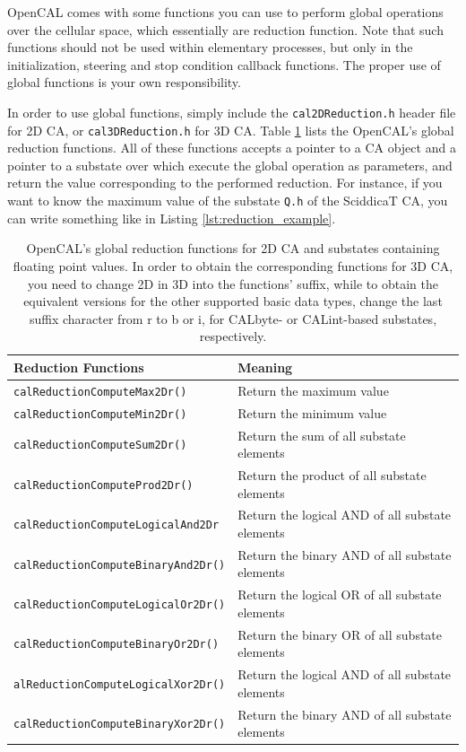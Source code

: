 OpenCAL comes with some functions you can use to perform global
operations over the cellular space, which essentially are reduction
function. Note that such functions should not be used within
elementary processes, but only in the initialization, steering and
stop condition callback functions. The proper use of global functions
is your own responsibility.

In order to use global functions, simply include the
\verb'cal2DReduction.h' header file for 2D CA, or
\verb'cal3DReduction.h' for 3D CA. Table \ref{tab:reductions} lists
the OpenCAL's global reduction functions. All of these functions
accepts a pointer to a CA object and a pointer to a substate over
which execute the global operation as parameters, and return the value
corresponding to the performed reduction. For instance, if you want to
know the maximum value of the substate \verb'Q.h' of the SciddicaT CA,
you can write something like in Listing \ref{lst:reduction_example}.



\begin{table}
  \centering
  \footnotesize
  \begin{tabular}{l|l}
    \hline
    Reduction Functions & Meaning \\
    \hline
    \verb'calReductionComputeMax2Dr()'       & Return the maximum value\\
    \verb'calReductionComputeMin2Dr()'       & Return the minimum value\\
    \verb'calReductionComputeSum2Dr()'       & Return the sum of all substate elements\\
    \verb'calReductionComputeProd2Dr()'      & Return the product of all substate elements\\
    \verb'calReductionComputeLogicalAnd2Dr'  & Return the logical AND of all substate elements\\
    \verb'calReductionComputeBinaryAnd2Dr()' & Return the binary AND of all substate elements\\
    \verb'calReductionComputeLogicalOr2Dr()' & Return the logical OR of all substate elements\\
    \verb'calReductionComputeBinaryOr2Dr()'  & Return the binary OR of all substate elements\\
    \verb'alReductionComputeLogicalXor2Dr()' & Return the logical AND of all substate elements\\
    \verb'calReductionComputeBinaryXor2Dr()' & Return the binary AND of all substate elements\\
    \hline
  \end{tabular}
  \caption{OpenCAL's global reduction functions for 2D CA and
    substates containing floating point values. In order to obtain the
    corresponding functions for 3D CA, you need to change 2D in 3D
    into the functions' suffix, while to obtain the equivalent
    versions for the other supported basic data types, change the last
    suffix character from r to b or i, for CALbyte- or CALint-based
    substates, respectively.}
  \label{tab:reductions}
\end{table}



